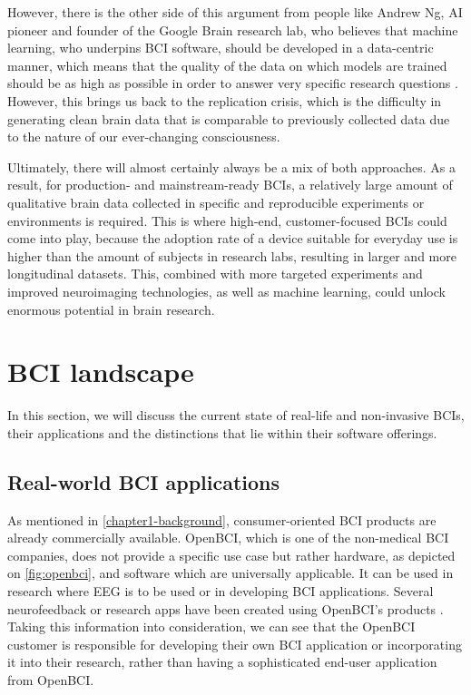 However, there is the other side of this argument from people like Andrew Ng, AI pioneer and founder of the Google Brain research lab, who believes that machine learning, who underpins BCI software, should be developed in a data-centric manner, which means that the quality of the data on which models are trained should be as high as possible in order to answer very specific research questions \citep{brown_why_2022}. However, this brings us back to the replication crisis, which is the difficulty in generating clean brain data that is comparable to previously collected data due to the nature of our ever-changing consciousness. 

Ultimately, there will almost certainly always be a mix of both approaches. As a result, for production- and mainstream-ready BCIs, a relatively large amount of qualitative brain data collected in specific and reproducible experiments or environments is required. This is where high-end, customer-focused BCIs could come into play, because the adoption rate of a device suitable for everyday use is higher than the amount of subjects in research labs, resulting in larger and more longitudinal datasets. This, combined with more targeted experiments and improved neuroimaging technologies, as well as machine learning, could unlock enormous potential in brain research.

\section{BCI landscape}
\label{chapter2-research-landscape}

In this section, we will discuss the current state of real-life and non-invasive BCIs, their applications and the distinctions that lie within their software offerings.

\subsection{Real-world BCI applications}
\label{chapter2-real-world-bci-applications}

As mentioned in \autoref{chapter1-background}, consumer-oriented BCI products are already commercially available. OpenBCI, which is one of the non-medical BCI companies, does not provide a specific use case but rather hardware, as depicted on \autoref{fig:openbci}, and software which are universally applicable. It can be used in research where EEG is to be used or in developing BCI applications. Several neurofeedback or research apps have been created using OpenBCI's products \citep{openbci_openbci_nodate}. Taking this information into consideration, we can see that the OpenBCI customer is responsible for developing their own BCI application or incorporating it into their research, rather than having a sophisticated end-user application from OpenBCI.

